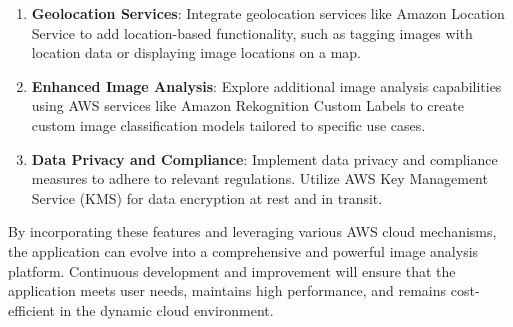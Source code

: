 \begin{enumerate}
    \item \textbf{Geolocation Services}: Integrate geolocation services like Amazon Location Service to add location-based functionality, such as tagging images with location data or displaying image locations on a map.
    
    \item \textbf{Enhanced Image Analysis}: Explore additional image analysis capabilities using AWS services like Amazon Rekognition Custom Labels to create custom image classification models tailored to specific use cases.
    
    \item \textbf{Data Privacy and Compliance}: Implement data privacy and compliance measures to adhere to relevant regulations. Utilize AWS Key Management Service (KMS) for data encryption at rest and in transit.
\end{enumerate}

By incorporating these features and leveraging various AWS cloud mechanisms, the application can evolve into a comprehensive and powerful image analysis platform. Continuous development and improvement will ensure that the application meets user needs, maintains high performance, and remains cost-efficient in the dynamic cloud environment.




\newpage


